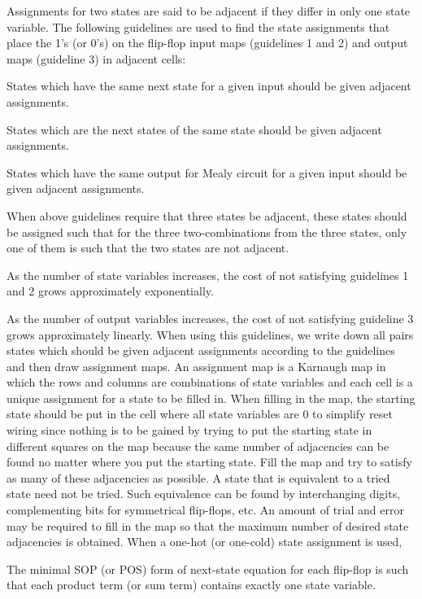 \documentclass[a4paper,12pt]{report}
\begin{document}
Assignments for two states are said to be adjacent if they differ in only one state variable. The following guidelines are used to find the state assignments that place the 1's (or 0's) on the flip-flop input maps (guidelines 1 and 2) and output maps (guideline 3) in adjacent cells:
\ben
\item States which have the same next state for a given input should be given adjacent assignments.
\item States which are the next states of the same state should be given adjacent assignments.
\item States which have the same output for Mealy circuit for a given input should be given adjacent assignments.
\item When above guidelines require that three states be adjacent, these states should be assigned such that for the three two-combinations from the three states, only one of them is such that the two states are not adjacent.
\item As the number of state variables increases, the cost of not satisfying guidelines 1 and 2 grows approximately exponentially.
\item As the number of output variables increases, the cost of not satisfying guideline 3 grows approximately linearly.
\een
When using this guidelines, we write down all pairs states which should be given adjacent assignments according to the guidelines and then draw assignment maps. An assignment map is a Karnaugh map in which the rows and columns are combinations of state variables and each cell is a unique assignment for a state to be filled in. When filling in the map, the starting state should be put in the cell where all state variables are 0 to simplify reset wiring since nothing is to be gained by trying to put the starting state in different squares on the map because the same number of adjacencies can be found no matter where you put the starting state. Fill the map and try to satisfy as many of these adjacencies as possible. A state that is equivalent to a tried state need not be tried. Such equivalence can be found by interchanging digits, complementing bits for symmetrical flip-flops, etc. An amount of trial and error may be required to fill in the map so that the maximum number of desired state adjacencies is obtained.
When a one-hot (or one-cold) state assignment is used,
\bit
\item The minimal SOP (or POS) form of next-state equation for each flip-flop is such that each product term (or sum term) contains exactly one state variable.
\end{document}
